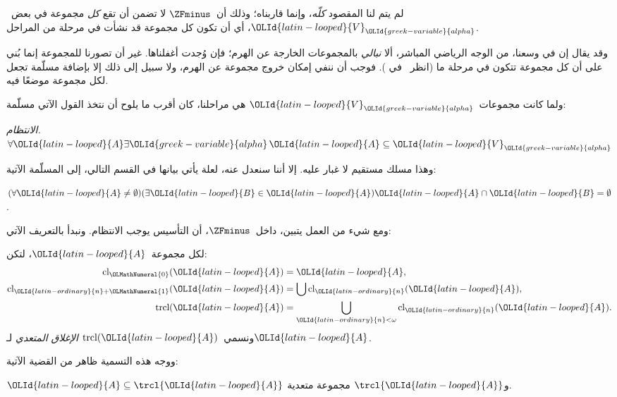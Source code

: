 \documentclass[../../../include/open-logic-section]{subfiles}
\begin{document}


لم يتم لنا المقصود \emph{كلّه}، وإنما قاربناه؛ وذلك أن~$\ZFminus$
لا تضمن أن تقع \emph{كل} مجموعة في بعض~${\OLId{latin-looped}{V}}_{\OLId{greek-variable}{alpha}}$، أي أن تكون كل
مجموعة قد نشأت في مرحلة من المراحل.

وقد يقال إن في وسعنا، من الوجه الرياضي المباشر، ألا \emph{نبالي}
بالمجموعات الخارجة عن الهرم؛ فإن وُجدت أغفلناها. غير أن تصورنا للمجموعة
إنما بُني على أن كل مجموعة تتكون في مرحلة ما (انظر~\stageshier{} في
). فوجب أن ننفي إمكان خروج مجموعة عن الهرم، ولا
سبيل إلى ذلك إلا بإضافة مسلّمة تجعل لكل مجموعة موضعًا فيه.

ولما كانت مجموعات~${\OLId{latin-looped}{V}}_{\OLId{greek-variable}{alpha}}$ هي مراحلنا، كان أقرب ما يلوح أن نتخذ
القول الآتي مسلّمة:

\begin{defish}
\emph{الانتظام.} $\forall {\OLId{latin-looped}{A}} \exists {\OLId{greek-variable}{alpha}}\, {\OLId{latin-looped}{A}} \subseteq {\OLId{latin-looped}{V}}_{\OLId{greek-variable}{alpha}}$
\end{defish}

وهذا مسلك مستقيم لا غبار عليه. إلا أننا سنعدل عنه، لعلة يأتي بيانها في
القسم التالي، إلى المسلّمة الآتية:

\begin{axiom}[التأسيس]
$(\forall {\OLId{latin-looped}{A}} \neq \emptyset)(\exists {\OLId{latin-looped}{B}} \in {\OLId{latin-looped}{A}}){\OLId{latin-looped}{A}} \cap {\OLId{latin-looped}{B}} = \emptyset$.
\end{axiom}

ومع شيء من العمل يتبين، داخل~$\ZFminus$، أن التأسيس يوجب الانتظام.
ونبدأ بالتعريف الآتي:
\begin{defn}
لكل مجموعة~${\OLId{latin-looped}{A}}$، لتكن:
\begin{align*}
	\text{cl}_{\OLMathNumeral{0}}({\OLId{latin-looped}{A}}) &= {\OLId{latin-looped}{A}},\\
	\text{cl}_{{\OLId{latin-ordinary}{n}}+{\OLMathNumeral{1}}}({\OLId{latin-looped}{A}}) &= \bigcup \text{cl}_{\OLId{latin-ordinary}{n}}({\OLId{latin-looped}{A}}),\\
	\text{trcl}({\OLId{latin-looped}{A}}) &= \bigcup_{{\OLId{latin-ordinary}{n}} < \omega} \text{cl}_{{\OLId{latin-ordinary}{n}}}({\OLId{latin-looped}{A}}).
\end{align*}
ونسمي~$\text{trcl}({\OLId{latin-looped}{A}})$ \emph{الإغلاق المتعدي} لـ${\OLId{latin-looped}{A}}$.
\end{defn}
\noindent
ووجه هذه التسمية ظاهر من القضية الآتية:
\begin{prop}
${\OLId{latin-looped}{A}} \subseteq \trcl{{\OLId{latin-looped}{A}}}$ و$\trcl{{\OLId{latin-looped}{A}}}$ مجموعة متعدية.
\end{prop}
\end{document}
